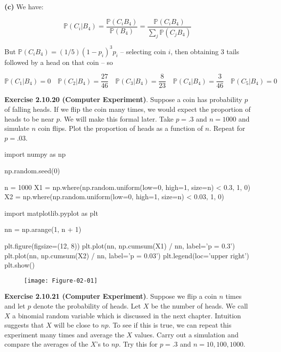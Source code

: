 \textbf{(c)} We have:

\[ \mathbb{P}(C_i | B_4) = \frac{\mathbb{P}(C_i B_4)}{\mathbb{P}(B_4)}= \frac{\mathbb{P}(C_i B_4)}{\sum_j \mathbb{P}(C_j B_4)}\]

But \(\mathbb{P}(C_i B_4) = (1/5) (1 - p_i)^3 p_i\) -- selecting coin
\(i\), then obtaining 3 tails followed by a head on that coin -- so

\[
\mathbb{P}(C_1 | B_4) = 0
\quad
\mathbb{P}(C_2 | B_4) = \frac{27}{46}
\quad
\mathbb{P}(C_3 | B_4) = \frac{8}{23}
\quad
\mathbb{P}(C_4 | B_4) = \frac{3}{46}
\quad
\mathbb{P}(C_5 | B_4) = 0
\]

\textbf{Exercise 2.10.20 (Computer Experiment)}. Suppose a coin has
probability \(p\) of falling heads. If we flip the coin many times, we
would expect the proportion of heads to be near \(p\). We will make this
formal later. Take \(p = .3\) and \(n = 1000\) and simulate \(n\) coin
flips. Plot the proportion of heads as a function of \(n\). Repeat for
\(p = .03\).

\begin{python}
import numpy as np

np.random.seed(0)

n = 1000
X1 = np.where(np.random.uniform(low=0, high=1, size=n) < 0.3, 1, 0) 
X2 = np.where(np.random.uniform(low=0, high=1, size=n) < 0.03, 1, 0) 
\end{python}

\begin{python}
import matplotlib.pyplot as plt

nn = np.arange(1, n + 1)

plt.figure(figsize=(12, 8))
plt.plot(nn, np.cumsum(X1) / nn, label='p = 0.3')
plt.plot(nn, np.cumsum(X2) / nn, label='p = 0.03')
plt.legend(loc='upper right')
plt.show()
\end{python}

\begin{figure}[H]
\texttt{[image: Figure-02-01]}
\end{figure}

\textbf{Exercise 2.10.21 (Computer Experiment)}. Suppose we flip a coin
\(n\) times and let \(p\) denote the probability of heads. Let \(X\) be
the number of heads. We call \(X\) a binomial random variable which is
discussed in the next chapter. Intuition suggests that \(X\) will be
close to \(np\). To see if this is true, we can repeat this experiment
many times and average the \(X\) values. Carry out a simulation and
compare the averages of the \(X\)'s to \(np\). Try this for \(p = .3\)
and \(n = 10, 100, 1000\).

